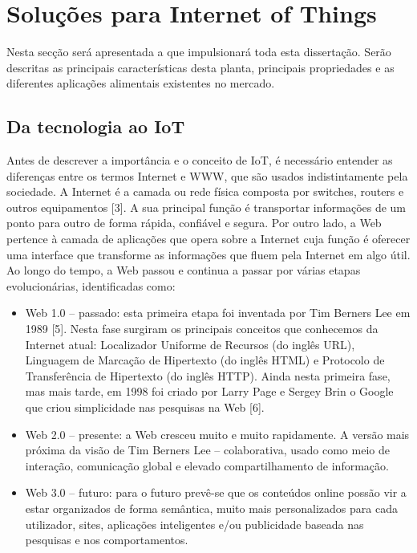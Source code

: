 
\chapter{Soluções para Internet of Things}

Nesta secção será apresentada a \sr que impulsionará toda esta dissertação. Serão descritas as principais características desta planta, principais propriedades e as diferentes aplicações alimentais existentes no mercado. 

	

\section{Da tecnologia ao IoT}


Antes de descrever a importância e o conceito de \ac{IoT}, é necessário entender as diferenças entre os termos Internet e \ac{WWW}, que são usados indistintamente pela sociedade. A Internet é a camada ou rede física composta por switches, routers e outros equipamentos [3]. A sua principal função é transportar informações de um ponto para outro de forma rápida, confiável e segura. Por outro lado, a Web pertence à camada de aplicações que opera sobre a Internet cuja função é oferecer uma interface que transforme as informações que fluem pela Internet em algo útil. Ao longo do tempo, a Web passou e continua a passar por várias etapas evolucionárias, identificadas como:

\begin{itemize}
	\item Web 1.0 – passado: esta primeira etapa foi inventada por Tim Berners Lee em 1989 [5]. Nesta fase surgiram os principais conceitos que conhecemos da Internet atual: Localizador Uniforme de Recursos (do inglês \ac{URL}), Linguagem de Marcação de Hipertexto (do inglês \ac{HTML}) e Protocolo de Transferência de Hipertexto (do inglês \ac{HTTP}). Ainda nesta primeira fase, mas mais tarde, em 1998 foi criado por Larry Page e Sergey Brin o Google que criou simplicidade nas pesquisas na Web [6]. 
	
	\item Web 2.0 – presente: a Web cresceu muito e muito rapidamente. A versão mais próxima da visão de Tim Berners Lee – colaborativa, usado como meio de interação, comunicação global e elevado compartilhamento de informação. 
	
	\item Web 3.0 – futuro: para o futuro prevê-se que os conteúdos online possão vir a estar organizados de forma semântica, muito mais personalizados para cada utilizador, sites, aplicações inteligentes e/ou publicidade baseada nas pesquisas e nos comportamentos.
\end{itemize}

